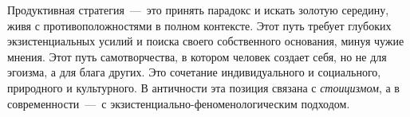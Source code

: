 Продуктивная стратегия~---~это принять парадокс и искать золотую середину, живя с противоположностями в полном контексте. Этот путь требует глубоких экзистенциальных усилий и поиска своего собственного основания, минуя чужие мнения. Этот путь самотворчества, в котором человек создает себя, но не для эгоизма, а для блага других. Это сочетание индивидуального и социального, природного и культурного. В античности эта позиция связана с \textit{стоицизмом}, а в современности~---~с экзистенциально-феноменологическим подходом.



